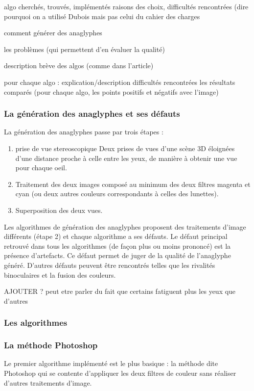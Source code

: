 algo cherchés, trouvés, implémentés
  raisons des choix, difficultés rencontrées
  (dire pourquoi on a utilisé Dubois mais pas celui du cahier des charges


comment générer des anaglyphes 

les problèmes (qui permettent d'en évaluer la qualité)

description brève des algos (comme dans l'article)

pour chaque algo : 
	explication/description
	difficultés rencontrées
 	les résultats comparés (pour chaque algo, les points positifs et négatifs avec l'image)

\subsubsection{La génération des anaglyphes et ses défauts}
La génération des anaglyphes passe par trois étapes :
	\begin{enumerate}
	\item prise de vue stereoscopique
		Deux prises de vues d'une scène 3D éloignées d'une distance proche à celle entre les yeux, de manière à obtenir une vue pour chaque oeil.
	\item 
		Traitement des deux images composé au minimum des deux filtres magenta et cyan (ou deux autres couleurs correspondants à celles des lunettes).
	\item
		Superposition des deux vues.
	\end{enumerate}
	
	Les algorithmes de génération des anaglyphes proposent des traitements d'image différents (étape 2) et chaque algorithme a ses défauts. Le défaut principal retrouvé dans tous les algorithmes (de façon plus ou moins prononcé) est la présence d'artefacts. Ce défaut permet de juger de la qualité de l'anaglyphe généré. D'autres défauts peuvent être rencontrés telles que les rivalités binoculaires et la fusion des couleurs. 
  
  AJOUTER ? peut etre parler du fait que certains fatiguent plus les yeux que d'autres
\subsubsection{Les algorithmes}

\subsubsection{La méthode Photoshop}
	Le premier algorithme implémenté est le plus basique : la méthode dite Photoshop qui se contente d'appliquer les deux filtres de couleur sans réaliser d'autres traitements d'image. 
	
